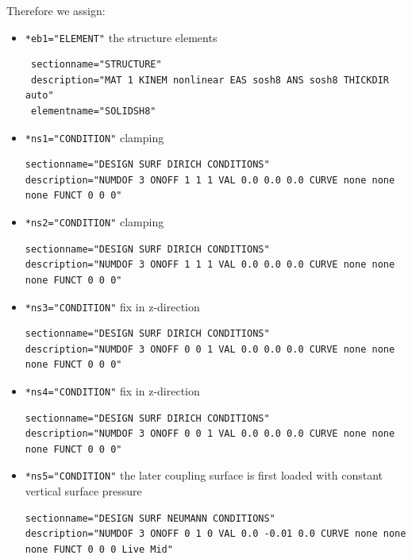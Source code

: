 Therefore we assign:
\begin{itemize}
 \item \verb|*eb1="ELEMENT"| \qquad the structure elements
 \begin{small} \begin{verbatim}
 sectionname="STRUCTURE"
 description="MAT 1 KINEM nonlinear EAS sosh8 ANS sosh8 THICKDIR auto"
 elementname="SOLIDSH8"
 \end{verbatim} \end{small}

 \item \verb|*ns1="CONDITION"| \qquad clamping
 \begin{small} \begin{verbatim}
sectionname="DESIGN SURF DIRICH CONDITIONS"
description="NUMDOF 3 ONOFF 1 1 1 VAL 0.0 0.0 0.0 CURVE none none none FUNCT 0 0 0"
 \end{verbatim} \end{small}

 \item \verb|*ns2="CONDITION"| \qquad clamping
 \begin{small} \begin{verbatim}
sectionname="DESIGN SURF DIRICH CONDITIONS"
description="NUMDOF 3 ONOFF 1 1 1 VAL 0.0 0.0 0.0 CURVE none none none FUNCT 0 0 0"
 \end{verbatim} \end{small}

 \item \verb|*ns3="CONDITION"| \qquad fix in z-direction
 \begin{small} \begin{verbatim}
sectionname="DESIGN SURF DIRICH CONDITIONS"
description="NUMDOF 3 ONOFF 0 0 1 VAL 0.0 0.0 0.0 CURVE none none none FUNCT 0 0 0"
 \end{verbatim} \end{small}

 \item \verb|*ns4="CONDITION"| \qquad fix in z-direction
 \begin{small} \begin{verbatim}
sectionname="DESIGN SURF DIRICH CONDITIONS"
description="NUMDOF 3 ONOFF 0 0 1 VAL 0.0 0.0 0.0 CURVE none none none FUNCT 0 0 0"
 \end{verbatim} \end{small}

 \item \verb|*ns5="CONDITION"| \qquad the later coupling surface is first loaded with constant vertical surface pressure
 \begin{small} \begin{verbatim}
sectionname="DESIGN SURF NEUMANN CONDITIONS"
description="NUMDOF 3 ONOFF 0 1 0 VAL 0.0 -0.01 0.0 CURVE none none none FUNCT 0 0 0 Live Mid"
 \end{verbatim} \end{small}


\end{itemize}
